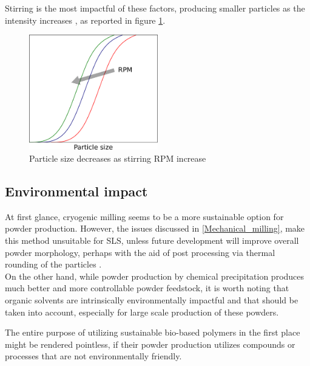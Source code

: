 \documentclass{article}
\begin{document}
    Stirring is the most impactful of these factors, producing smaller particles as the intensity increases \autocites{DechetMaximilianA2020OtDo}, as reported in figure \ref{fig:stirring_rpm}. 

    \begin{figure}[h!]
        \centering
        \includegraphics[width=0.5\textwidth]{Pictures/particle_size_stirring.eps}
        \caption{Particle size decreases as stirring RPM increase \autocites{Inkscape}}
        \label{fig:stirring_rpm}
    \end{figure}

    \subsection{Environmental impact \label{Environmental_impact}}

    At first glance, cryogenic milling seems to be a more sustainable option for powder production. However, the issues discussed in \ref{Mechanical_milling}, 
    make this method unsuitable for SLS, unless future development will improve overall powder morphology, perhaps with the aid of 
    post processing via thermal rounding of the particles \autocite{DechetMaximilianA2020OtDo}. \\ 
    
    On the other hand, while powder production by 
    chemical precipitation produces much better and more 
    controllable powder feedstock, it is worth noting that organic solvents are intrinsically environmentally impactful and that should be taken 
    into account, especially for large scale production of these powders. 

    The entire purpose of utilizing sustainable bio-based polymers in the first place might be rendered pointless, if their powder production 
    utilizes compounds or processes that are not environmentally friendly. \\ 
\end{document}
